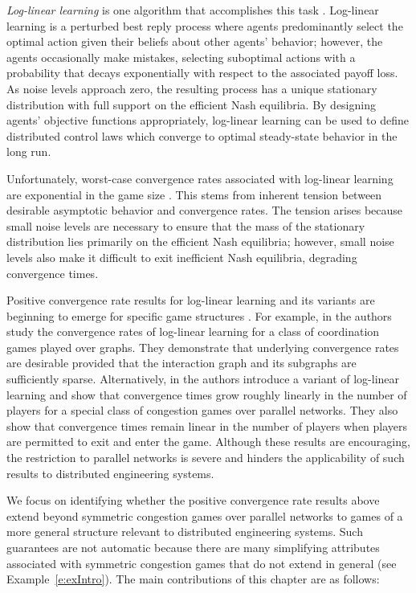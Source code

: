 \emph{Log-linear learning} is one algorithm that accomplishes this task \cite{Blume1993}. Log-linear learning is a  {perturbed} best reply process where agents predominantly select the optimal action given their beliefs about other agents' behavior; however, the agents occasionally make mistakes, selecting suboptimal actions with a probability that decays exponentially with respect to the associated payoff loss.  
As noise levels approach zero, the resulting process has a unique stationary distribution with full support on the efficient Nash equilibria.  By designing agents' objective functions appropriately, log-linear learning can be used to define distributed control laws which converge to optimal steady-state behavior in the long run.%


Unfortunately, worst-case convergence rates associated with log-linear learning are exponential in the game size \cite{Shah2010}.  This stems from inherent tension between desirable asymptotic behavior and convergence rates.  The tension arises because small noise levels are necessary to ensure that the mass of the stationary distribution lies primarily on the efficient Nash equilibria; however, small noise levels also make it difficult to exit inefficient Nash equilibria,  degrading convergence times.  

Positive convergence rate results for log-linear learning and its variants are beginning to emerge for specific game structures \cite{Montanari2010,Kreindler2011,Shah2010,Arieli2011}.  For example, in \cite{Montanari2010} the authors study the convergence rates of log-linear learning for a class of coordination games played over graphs. They demonstrate that underlying convergence rates are desirable provided that the interaction graph and its subgraphs are sufficiently sparse.  Alternatively, in \cite{Shah2010} the authors introduce a variant of log-linear learning and show that  convergence times grow roughly linearly in the number of players for a special class of congestion games over parallel networks.  They also show that convergence times remain linear in the number of players when players are permitted to exit and enter the game.  Although these results are encouraging, the restriction to parallel networks is severe and hinders the applicability of such results to distributed engineering systems.  

We focus on identifying whether the positive convergence rate results above extend beyond symmetric congestion games over parallel networks to games of a more general structure relevant to distributed engineering systems.  Such guarantees are not automatic because there are many simplifying attributes associated with symmetric congestion games that do not extend in general (see Example~\ref{e:exIntro}).  The main contributions of this chapter are as follows:

